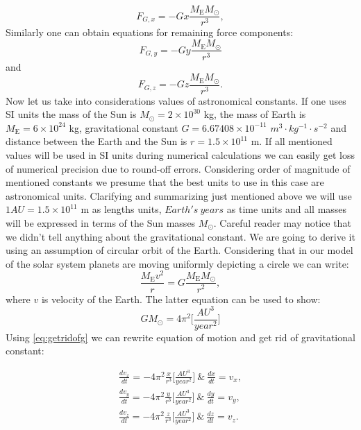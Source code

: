 \documentclass[10pt]{article}
\begin{document}
\begin{equation}\label{eq:force_motion}
F_{G,x}=-Gx\frac{M_{\mathrm{E}}M_{\odot}}{r^3},
\end{equation}
Similarly one can obtain equations for remaining force components:
\[
{F_{G,y}}=-Gy\frac{M_{\mathrm{E}}M_{\odot}}{r^3}
\]
and
\[
{F_{G,z}}=-Gz\frac{M_{\mathrm{E}}M_{\odot}}{r^3}.
\]
Now let us take into considerations values of astronomical constants. If one uses SI units the mass of the Sun is $M_{\odot}=2\times 10^{30}$ kg, the mass of Earth is $M_{\mathrm{E}}=6\times 10^{24}$ kg, gravitational constant $G=6.67408 \times 10^{-11}$ $m^3 \cdot kg^{-1} \cdot s^{-2}$ and distance between the Earth and the Sun is $r=1.5 \times 10^{11}$ m. If all mentioned values will be used in SI units during numerical calculations we can easily get loss of numerical precision due to round-off errors. Considering order of magnitude of mentioned constants we presume that the best units to use in this case are astronomical units. Clarifying and summarizing just mentioned
above we will use $1AU=1.5 \times 10^{11}$ m as lengths units, $Earth's\ years$ as time units and all masses will be expressed in terms of the Sun masses $M_{\odot}$. Careful reader may notice that we didn't tell anything about the gravitational constant. We are going to derive it using an assumption of circular orbit of the Earth.
Considering that in our model of the solar system planets are moving uniformly depicting a circle we can write:
\[
\frac{M_{\mathrm{E}}v^2}{r}=G\frac{M_{\mathrm{E}}M_{\odot}}{r^2},
\]
where $v$ is velocity of the Earth.
The latter equation can be used to show:
\begin{equation}\label{eq:getridofg}
GM_{\odot} = 4\pi^2 \Bigg[ \frac{AU^3}{year^2}\Bigg]
\end{equation}
Using \ref{eq:getridofg} we can rewrite equation of motion and get rid of gravitational constant:

\begin{equation}\label{eq:motion}
\begin{aligned}
\frac{dv_x}{dt}=-4\pi^2\frac{x}{r^3} \Bigg[ \frac{AU^3}{year^2}\Bigg]\ \& \ \frac{dx}{dt} = v_x,\\
\frac{dv_y}{dt}=-4\pi^2\frac{y}{r^3} \Bigg[ \frac{AU^3}{year^2}\Bigg]\ \& \ \frac{dy}{dt} = v_y, \\
\frac{dv_z}{dt}=-4\pi^2\frac{z}{r^3} \Bigg[ \frac{AU^3}{year^2}\Bigg]\ \& \ \frac{dz}{dt} = v_z.
\end{aligned}
\end{equation}
\end{document}
